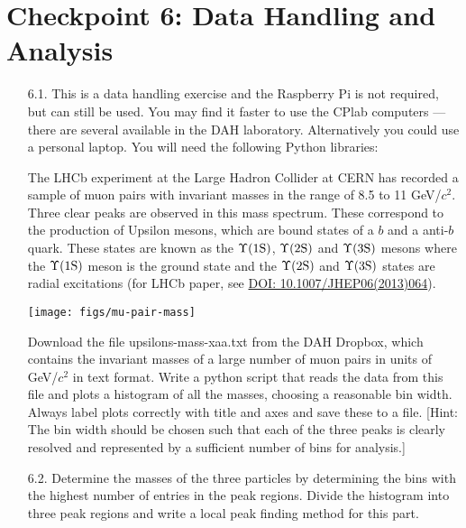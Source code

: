 \newpage
\section{Checkpoint 6: Data Handling and Analysis}

\begin{enumerate}

\item [6.1.] This is a data handling exercise and the Raspberry Pi is not required, but can still be used.
You may find it faster to use the CPlab computers --- there are several available in the DAH laboratory.
Alternatively you could use a personal laptop.
You will need the following Python libraries:


The LHCb experiment at the Large Hadron Collider at CERN has recorded a sample of muon pairs with invariant masses in the range of 8.5 to 11 GeV/$c^2$.
Three clear peaks are observed in this mass spectrum.
These correspond to the production of Upsilon mesons, which are bound states of a $b$ and a anti-$b$ quark.
These states are known as the $\Upsilon \rm (1S)$, $\Upsilon \rm (2S)$ and $\Upsilon \rm (3S)$ mesons where the $\Upsilon \rm (1S)$ meson is the ground state and the $\Upsilon \rm (2S)$  and $\Upsilon \rm (3S)$ states are radial excitations (for LHCb paper, see \href{https://link.springer.com/article/10.1007/JHEP06(2013)064}{DOI: 10.1007/JHEP06(2013)064}).

\begin{center}
    \texttt{[image: figs/mu-pair-mass]}
\end{center}

Download the file upsilons-mass-xaa.txt from the DAH Dropbox, which contains the invariant masses of a large number of muon pairs in units of GeV/$c^2$ in text format. 
Write a python script that reads the data from this file and plots a histogram of all the masses, choosing a reasonable bin width.
Always label plots correctly with title and axes and save these to a file.
[Hint: The bin width should be chosen such that each of the three peaks is clearly resolved and represented by a sufficient number of bins for analysis.]


\item [6.2.] Determine the masses of the three particles by determining the bins with the highest number of entries in the peak regions.
Divide the histogram into three peak regions and write a local peak finding method for this part.


\end{enumerate}
